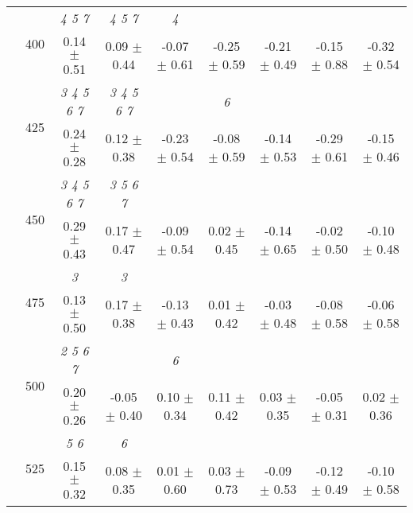 \begin{table}[h]
{\begin{tabular}{
        ccccccccc}
 & \multirow{2}{*}{400}& \textit{ 4 5 7 }& \textit{ 4 5 7 }& \textit{ 4 }& & & &  \\ 
 & & 0.14 $\pm$ 0.51& 0.09 $\pm$ 0.44& -0.07 $\pm$ 0.61& -0.25 $\pm$ 0.59& -0.21 $\pm$ 0.49& -0.15 $\pm$ 0.88& -0.32 $\pm$ 0.54 \\ 
 & \multirow{2}{*}{425}& \cellcolor[HTML]{EFEFEF} \textit{ 3 4 5 6 7 }& \cellcolor[HTML]{EFEFEF} \textit{ 3 4 5 6 7 }& \cellcolor[HTML]{EFEFEF} & \cellcolor[HTML]{EFEFEF} \textit{ 6 }& \cellcolor[HTML]{EFEFEF} & \cellcolor[HTML]{EFEFEF} & \cellcolor[HTML]{EFEFEF}  \\ 
 & & \cellcolor[HTML]{EFEFEF} 0.24 $\pm$ 0.28& \cellcolor[HTML]{EFEFEF} 0.12 $\pm$ 0.38& \cellcolor[HTML]{EFEFEF} -0.23 $\pm$ 0.54& \cellcolor[HTML]{EFEFEF} -0.08 $\pm$ 0.59& \cellcolor[HTML]{EFEFEF} -0.14 $\pm$ 0.53& \cellcolor[HTML]{EFEFEF} -0.29 $\pm$ 0.61& \cellcolor[HTML]{EFEFEF} -0.15 $\pm$ 0.46 \\ 
 & \multirow{2}{*}{450}& \textit{ 3 4 5 6 7 }& \textit{ 3 5 6 7 }& & & & &  \\ 
 & & 0.29 $\pm$ 0.43& 0.17 $\pm$ 0.47& -0.09 $\pm$ 0.54& 0.02 $\pm$ 0.45& -0.14 $\pm$ 0.65& -0.02 $\pm$ 0.50& -0.10 $\pm$ 0.48 \\ 
 & \multirow{2}{*}{475}& \cellcolor[HTML]{EFEFEF} \textit{ 3 }& \cellcolor[HTML]{EFEFEF} \textit{ 3 }& \cellcolor[HTML]{EFEFEF} & \cellcolor[HTML]{EFEFEF} & \cellcolor[HTML]{EFEFEF} & \cellcolor[HTML]{EFEFEF} & \cellcolor[HTML]{EFEFEF}  \\ 
 & & \cellcolor[HTML]{EFEFEF} 0.13 $\pm$ 0.50& \cellcolor[HTML]{EFEFEF} 0.17 $\pm$ 0.38& \cellcolor[HTML]{EFEFEF} -0.13 $\pm$ 0.43& \cellcolor[HTML]{EFEFEF} 0.01 $\pm$ 0.42& \cellcolor[HTML]{EFEFEF} -0.03 $\pm$ 0.48& \cellcolor[HTML]{EFEFEF} -0.08 $\pm$ 0.58& \cellcolor[HTML]{EFEFEF} -0.06 $\pm$ 0.58 \\ 
 & \multirow{2}{*}{500}& \textit{ 2 5 6 7 }& & \textit{ 6 }& & & &  \\ 
 & & 0.20 $\pm$ 0.26& -0.05 $\pm$ 0.40& 0.10 $\pm$ 0.34& 0.11 $\pm$ 0.42& 0.03 $\pm$ 0.35& -0.05 $\pm$ 0.31& 0.02 $\pm$ 0.36 \\ 
 & \multirow{2}{*}{525}& \cellcolor[HTML]{EFEFEF} \textit{ 5 6 }& \cellcolor[HTML]{EFEFEF} \textit{ 6 }& \cellcolor[HTML]{EFEFEF} & \cellcolor[HTML]{EFEFEF} & \cellcolor[HTML]{EFEFEF} & \cellcolor[HTML]{EFEFEF} & \cellcolor[HTML]{EFEFEF}  \\ 
 & & \cellcolor[HTML]{EFEFEF} 0.15 $\pm$ 0.32& \cellcolor[HTML]{EFEFEF} 0.08 $\pm$ 0.35& \cellcolor[HTML]{EFEFEF} 0.01 $\pm$ 0.60& \cellcolor[HTML]{EFEFEF} 0.03 $\pm$ 0.73& \cellcolor[HTML]{EFEFEF} -0.09 $\pm$ 0.53& \cellcolor[HTML]{EFEFEF} -0.12 $\pm$ 0.49& \cellcolor[HTML]{EFEFEF} -0.10 $\pm$ 0.58 \\ 

\end{tabular}}
\end{table}
